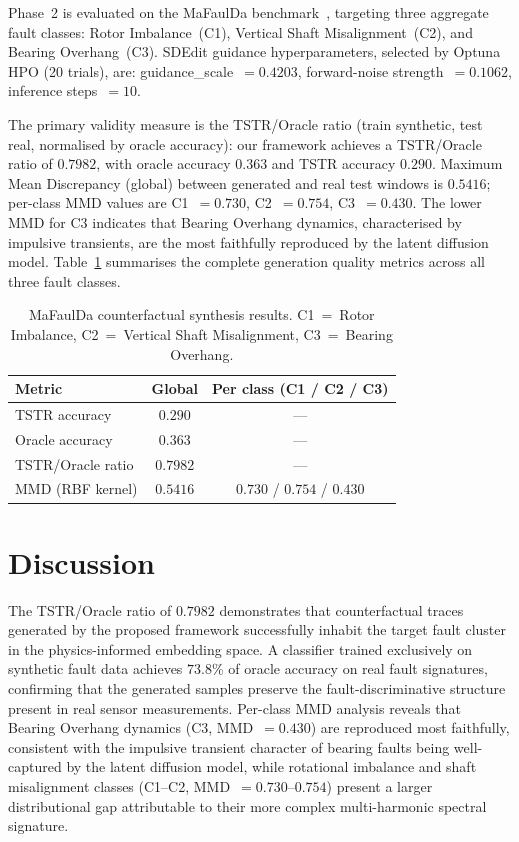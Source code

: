 \documentclass[conference]{IEEEtran}
\begin{document}
Phase~2 is evaluated on the MaFaulDa benchmark~\cite{ribeiro2017mafaulda, spotorno2026linking},
targeting three aggregate fault classes: Rotor Imbalance~(C1), Vertical Shaft Misalignment~(C2),
and Bearing Overhang~(C3).
SDEdit guidance hyperparameters, selected by Optuna HPO (20 trials), are:
guidance\_scale~$= 0.4203$, forward-noise strength~$= 0.1062$, inference steps~$= 10$.

The primary validity measure is the TSTR/Oracle ratio (train synthetic, test real, normalised
by oracle accuracy): our framework achieves a TSTR/Oracle ratio of $0.7982$, with oracle accuracy
$0.363$ and TSTR accuracy $0.290$.
Maximum Mean Discrepancy (global) between generated and real test windows is $0.5416$; per-class
MMD values are C1~$= 0.730$, C2~$= 0.754$, C3~$= 0.430$.
The lower MMD for C3 indicates that Bearing Overhang dynamics, characterised by impulsive transients,
are the most faithfully reproduced by the latent diffusion model.
Table~\ref{tab:mafaulda} summarises the complete generation quality metrics across all three fault classes.

\begin{table}[h]
\caption{MaFaulDa counterfactual synthesis results. C1~=~Rotor Imbalance, C2~=~Vertical Shaft Misalignment, C3~=~Bearing Overhang.}
\label{tab:mafaulda}
\centering\small
\begin{tabular}{lcc}
\toprule
Metric & Global & Per class (C1 / C2 / C3) \\
\midrule
TSTR accuracy         & $0.290$  & --- \\
Oracle accuracy       & $0.363$  & --- \\
TSTR/Oracle ratio     & $0.7982$ & --- \\
MMD (RBF kernel)      & $0.5416$ & $0.730$ / $0.754$ / $0.430$ \\
\bottomrule
\end{tabular}
\end{table}

\section{Discussion}
\label{sec:discussion}

The TSTR/Oracle ratio of $0.7982$ demonstrates that counterfactual traces generated by the proposed framework successfully inhabit the target fault cluster in the physics-informed embedding space. A classifier trained exclusively on synthetic fault data achieves $73.8$\% of oracle accuracy on real fault signatures, confirming that the generated samples preserve the fault-discriminative structure present in real sensor measurements. Per-class MMD analysis reveals that Bearing Overhang dynamics (C3, MMD~$=0.430$) are reproduced most faithfully, consistent with the impulsive transient character of bearing faults being well-captured by the latent diffusion model, while rotational imbalance and shaft misalignment classes (C1--C2, MMD~$=0.730$--$0.754$) present a larger distributional gap attributable to their more complex multi-harmonic spectral signature.
\end{document}
